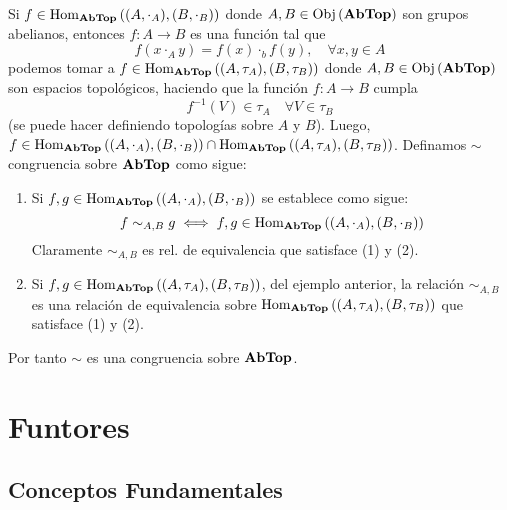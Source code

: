\documentclass[12pt]{report}
\theoremstyle{largebreak}
\newcommand\cf[3]{\ensuremath{#1:#2\rightarrow#3}}
\newcommand{\Obj}[1]{\ensuremath{\textup{Obj}\left(#1\right)}}
\newcommand{\Hom}[3]{\ensuremath{\textup{Hom}_{#1}\left(#2,#3\right)}}
\newcommand{\Cat}[1]{\ensuremath{\textup{\textbf{#1}}}}
\begin{document}
    \begin{obs}
        Si $f\in\Hom{\Cat{AbTop}}{(A,\cdot_A)}{(B,\cdot_B)}$ donde $A,B\in\Obj{\Cat{AbTop}}$ son grupos abelianos, entonces $\cf{f}{A}{B}$ es una función tal que
        \begin{equation*}
            f(x\cdot_Ay)=f(x)\cdot_bf(y),\quad\forall x,y\in A
        \end{equation*}
        podemos tomar a $f\in\Hom{\Cat{AbTop}}{(A,\tau_A)}{(B,\tau_B)}$ donde $A,B\in\Obj{\Cat{AbTop}}$ son espacios topológicos, haciendo que la función $\cf{f}{A}{B}$ cumpla
        \begin{equation*}
            f^{-1}(V)\in\tau_A\quad\forall V\in\tau_B
        \end{equation*}
        (se puede hacer definiendo topologías sobre $A$ y $B$). Luego, $f\in\Hom{\Cat{AbTop}}{(A,\cdot_A)}{(B,\cdot_B)}\cap\Hom{\Cat{AbTop}}{(A,\tau_A)}{(B,\tau_B)}$. Definamos $\sim$ congruencia sobre $\Cat{AbTop}$ como sigue:
        \begin{enumerate}
            \item Si $f,g\in\Hom{\Cat{AbTop}}{(A,\cdot_A)}{(B,\cdot_B)}$ se establece como sigue:
            \begin{equation*}
                f\sim_{A,B}g\iff f,g\in \Hom{\Cat{AbTop}}{(A,\cdot_A)}{(B,\cdot_B)}
            \end{equation*}
            Claramente $\sim_{A,B}$ es rel. de equivalencia que satisface (1) y (2).
            \item Si $f,g\in\Hom{\Cat{AbTop}}{(A,\tau_A)}{(B,\tau_B)}$, del ejemplo anterior, la relación $\sim_{A,B}$ es una relación de equivalencia sobre $\Hom{\Cat{AbTop}}{(A,\tau_A)}{(B,\tau_B)}$ que satisface (1) y (2).
        \end{enumerate}
        Por tanto $\sim$ es una congruencia sobre $\Cat{AbTop}$.
    \end{obs}

    \chapter{Funtores}

    \section{Conceptos Fundamentales}
    
\end{document}

